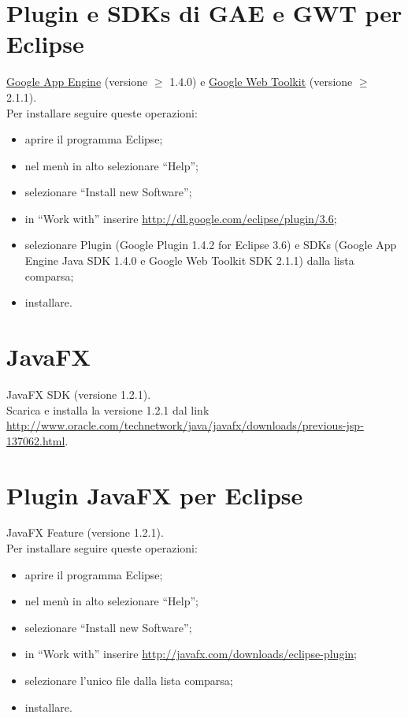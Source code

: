 \section{Plugin e SDKs di GAE e GWT per Eclipse}
\underline{Google App Engine} (versione $\geq$ 1.4.0) e \underline{Google Web
Toolkit} (versione $\geq$ 2.1.1).
\\
Per installare seguire queste
operazioni: 
\begin{itemize}
\item {aprire il programma Eclipse;} 
\item {nel men\`u in alto selezionare ``Help'';}
\item {selezionare ``Install new Software'';}
\item {in ``Work with'' inserire \url{http://dl.google.com/eclipse/plugin/3.6};}
\item {selezionare Plugin (Google Plugin 1.4.2 for Eclipse 3.6) e SDKs (Google
App Engine Java SDK 1.4.0 e Google Web Toolkit SDK 2.1.1) dalla lista comparsa;}
\item {installare.}
\end{itemize} 

\section{JavaFX}
JavaFX SDK (versione 1.2.1).
\\
Scarica e installa la versione 1.2.1 dal link \\
\url{http://www.oracle.com/technetwork/java/javafx/downloads/previous-jsp-137062.html}.

\section{Plugin JavaFX per Eclipse}
JavaFX Feature (versione 1.2.1).
\\
Per installare seguire queste
operazioni: 
\begin{itemize}
\item {aprire il programma Eclipse;} 
\item {nel men\`u in alto selezionare ``Help'';}
\item {selezionare ``Install new Software'';}
\item {in ``Work with'' inserire \url{http://javafx.com/downloads/eclipse-plugin};}
\item {selezionare l'unico file dalla lista comparsa;}
\item {installare.}
\end{itemize} 

